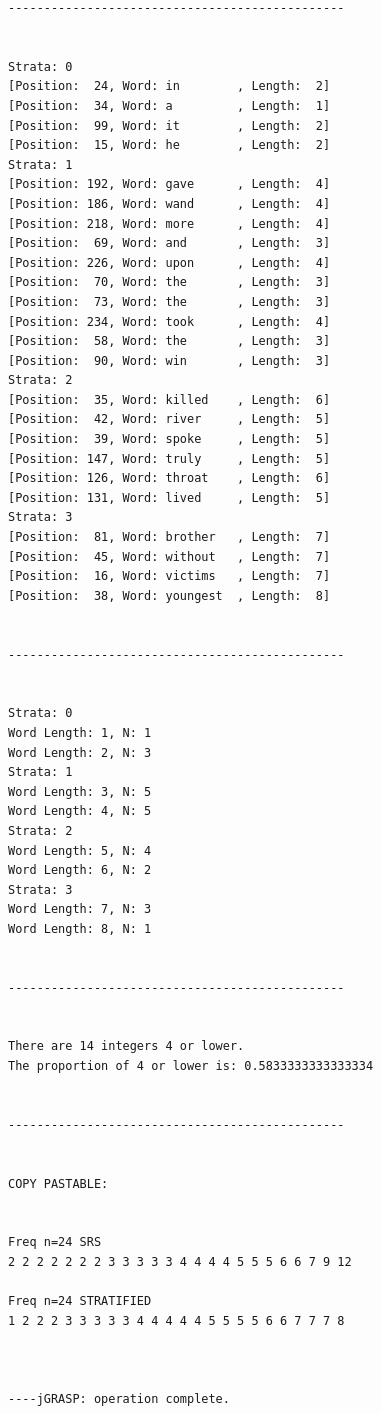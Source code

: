 \documentclass[letterpaper]{article}
\begin{document}
\begin{verbatim}
-----------------------------------------------


Strata: 0
[Position:  24, Word: in        , Length:  2]
[Position:  34, Word: a         , Length:  1]
[Position:  99, Word: it        , Length:  2]
[Position:  15, Word: he        , Length:  2]
Strata: 1
[Position: 192, Word: gave      , Length:  4]
[Position: 186, Word: wand      , Length:  4]
[Position: 218, Word: more      , Length:  4]
[Position:  69, Word: and       , Length:  3]
[Position: 226, Word: upon      , Length:  4]
[Position:  70, Word: the       , Length:  3]
[Position:  73, Word: the       , Length:  3]
[Position: 234, Word: took      , Length:  4]
[Position:  58, Word: the       , Length:  3]
[Position:  90, Word: win       , Length:  3]
Strata: 2
[Position:  35, Word: killed    , Length:  6]
[Position:  42, Word: river     , Length:  5]
[Position:  39, Word: spoke     , Length:  5]
[Position: 147, Word: truly     , Length:  5]
[Position: 126, Word: throat    , Length:  6]
[Position: 131, Word: lived     , Length:  5]
Strata: 3
[Position:  81, Word: brother   , Length:  7]
[Position:  45, Word: without   , Length:  7]
[Position:  16, Word: victims   , Length:  7]
[Position:  38, Word: youngest  , Length:  8]


-----------------------------------------------


Strata: 0
Word Length: 1, N: 1
Word Length: 2, N: 3
Strata: 1
Word Length: 3, N: 5
Word Length: 4, N: 5
Strata: 2
Word Length: 5, N: 4
Word Length: 6, N: 2
Strata: 3
Word Length: 7, N: 3
Word Length: 8, N: 1


-----------------------------------------------


There are 14 integers 4 or lower.
The proportion of 4 or lower is: 0.5833333333333334


-----------------------------------------------


COPY PASTABLE: 


Freq n=24 SRS
2 2 2 2 2 2 2 3 3 3 3 3 4 4 4 4 5 5 5 6 6 7 9 12 

Freq n=24 STRATIFIED
1 2 2 2 3 3 3 3 3 4 4 4 4 4 5 5 5 5 6 6 7 7 7 8 



----jGRASP: operation complete.
\end{verbatim}
\end{document}
